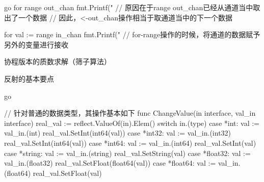 \begin{outline}[enumerate]
\begin{code-block}{go}
for range out_chan {
    fmt.Printf("%
                                   // 原因在于range out_chan已经从通道当中取出了一个数据
                                   // 因此，<-out_chan操作相当于取通道当中的下一个数据
}

for val := range in_chan {
    fmt.Printf("%
                                  // for-range操作的时候，将通道的数据赋予另外的变量进行接收
}
\end{code-block}

  \1 协程版本的质数求解（筛子算法）


  \1 反射的基本要点

\begin{code-block}{go}

// 针对普通的数据类型，其操作基本如下
func ChangeValue(in interface{}, val_in interface{}) {
    real_val := reflect.ValueOf(in).Elem()
    switch in.(type) {
    case *int:
        val := val_in.(int)
        real_val.SetInt(int64(val))
    case *int32:
        val := val_in.(int32)
        real_val.SetInt(int64(val))
    case *int64:
        val := val_in.(int64)
        real_val.SetInt(val)
    case *string:
        val := val_in.(string)
        real_val.SetString(val)
    case *float32:
        val := val_in.(float32)
        real_val.SetFloat(float64(val))
    case *float64:
        val := val_in.(float64)
        real_val.SetFloat(val)
    }
}


\end{code-block}
\end{outline}
